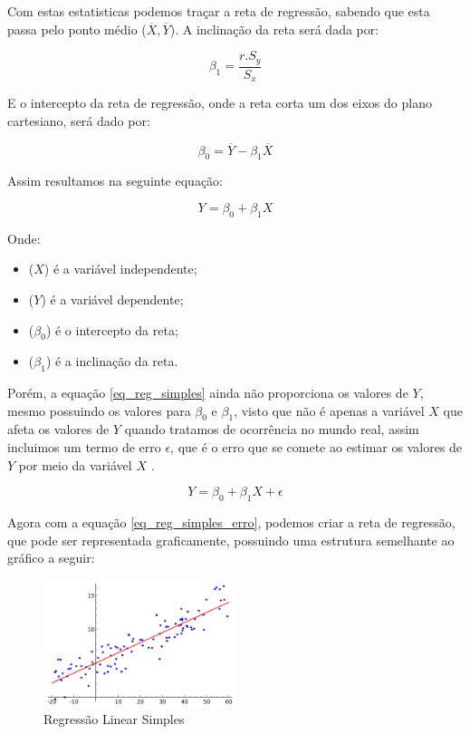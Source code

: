 \documentclass[
	12pt,				%
	openright,			%
	oneside,			%
	a4paper,			%
	english,			%
	brazil				%
	]{abntex2}
\begin{document}
Com estas estatisticas podemos traçar a reta de regressão, sabendo que esta passa pelo ponto médio
($\overline{X}, \overline{Y}$). A inclinação da reta será dada por:

\begin{equation}
	\label{inclinacao_reta}
	\beta_1 = \frac{r.S_y}{S_x}
\end{equation}

E o intercepto da reta de regressão, onde a reta corta um dos eixos do plano cartesiano, 
será dado por:

\begin{equation}
	\label{intercepto_reta}
	\beta_0 = \overline{Y} - \beta_1 \overline{X}
\end{equation}

Assim resultamos na seguinte equação:

\begin{equation}
\label{eq_reg_simples}
	Y = \beta_0 + \beta_1X
\end{equation}

Onde:
\begin{itemize}
	\item ($X$) é a variável independente;
	\item ($Y$) é a variável dependente;
	\item ($\beta_0$) é o intercepto da reta;
	\item ($\beta_1$) é a inclinação da reta. 
\end{itemize}

Porém, a equação \ref{eq_reg_simples} ainda não proporciona os valores de $Y$, mesmo possuindo
os valores para $\beta_0$ e $\beta_1$, visto que não é apenas a variável  $X$ que afeta os valores de
$Y$ quando tratamos de ocorrência no mundo real, assim incluimos um termo de erro $\epsilon$, que é
o erro que se comete ao estimar os valores de $Y$ por meio da variável $X$ \cite{modelos_regressao_linear}.

\begin{equation}
	\label{eq_reg_simples_erro}
	Y = \beta_0 + \beta_1X + \epsilon
\end{equation}

Agora com a equação \ref{eq_reg_simples_erro}, podemos criar a reta de regressão, que pode ser
representada graficamente, possuindo uma estrutura semelhante ao gráfico a seguir:

\begin{figure}[H]
    \centering
    \caption{\label{Regressão Linear Simples}Regressão Linear Simples}
    \includegraphics[width=0.50\textwidth]{../Imgs/reg_linear_simples.png}
\end{figure}
\end{document}
